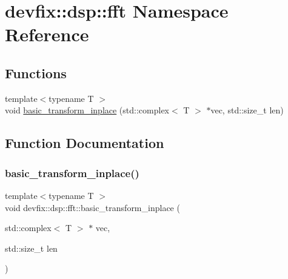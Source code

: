 \hypertarget{namespacedevfix_1_1dsp_1_1fft}{}\section{devfix\+:\+:dsp\+:\+:fft Namespace Reference}
\label{namespacedevfix_1_1dsp_1_1fft}
\subsection*{Functions}
\begin{DoxyCompactItemize}
\item 
{\footnotesize template$<$typename T $>$ }\\void \hyperlink{namespacedevfix_1_1dsp_1_1fft_a20e0aebb7e30c6f1e5a6678458d87c68}{basic\+\_\+transform\+\_\+inplace} (std\+::complex$<$ T $>$ $\ast$vec, std\+::size\+\_\+t len)
\end{DoxyCompactItemize}


\subsection{Function Documentation}
\mbox{\label{namespacedevfix_1_1dsp_1_1fft_a20e0aebb7e30c6f1e5a6678458d87c68}} 
\subsubsection{\texorpdfstring{basic\+\_\+transform\+\_\+inplace()}{basic\_transform\_inplace()}}
{\footnotesize\ttfamily template$<$typename T $>$ \\
void devfix\+::dsp\+::fft\+::basic\+\_\+transform\+\_\+inplace (\begin{DoxyParamCaption}\item[{std\+::complex$<$ T $>$ $\ast$}]{vec,  }\item[{std\+::size\+\_\+t}]{len }\end{DoxyParamCaption})}

